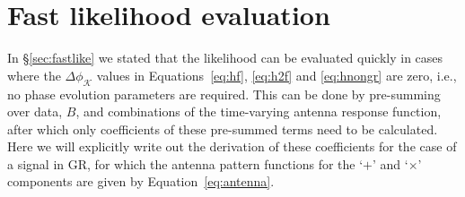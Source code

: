 \section{Fast likelihood evaluation}\label{app:fle}

In \S\ref{sec:fastlike} we stated that the likelihood can be evaluated quickly in cases where the $\Delta\phi_{\mathcal{K}}$ values in Equations~\ref{eq:hf}, \ref{eq:h2f}
and \ref{eq:hnongr} are zero, i.e., no phase evolution parameters are required. This can be done by pre-summing over data, $B$, and combinations of the time-varying
antenna response function, after which only coefficients of these pre-summed terms need to be calculated. Here we will explicitly write out the derivation
of these coefficients for the case of a signal in GR, for which the antenna pattern functions for the `$+$' and `$\times$' components are given by Equation~\ref{eq:antenna}.

